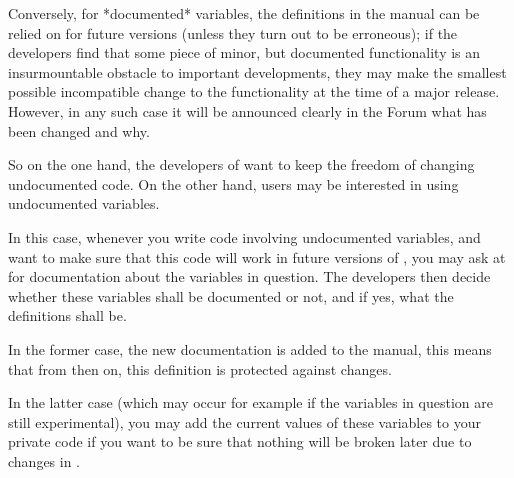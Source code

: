 Conversely, for *documented* variables, the definitions in the {\GAP}
manual can be relied on for future {\GAP} versions (unless they turn out
to be erroneous);
if the {\GAP} developers find that some piece of minor, but documented
functionality is an insurmountable obstacle to important developments,
they may make the smallest possible incompatible change to the functionality
at the time of a major release.
However, in any such case it will be announced clearly in the {\GAP} Forum
what has been changed and why.

So on the one hand, the developers of {\GAP} want to keep the freedom
of changing undocumented {\GAP} code.
On the other hand, users may be interested in using undocumented
variables.

In this case, whenever you write {\GAP} code involving undocumented
variables,
and want to make sure that this code will work in future versions of {\GAP},
you may ask at  for documentation
about the variables in question.
The {\GAP} developers then decide whether these variables shall be
documented or not, and if yes, what the definitions shall be.

In the former case, the new documentation is added to the {\GAP} manual,
this means that from then on, this definition is protected against
changes.

In the latter case (which may occur for example if the variables
in question are still experimental), you may add the current
values of these variables to your private code if you want to
be sure that nothing will be broken later due to changes in {\GAP}.



